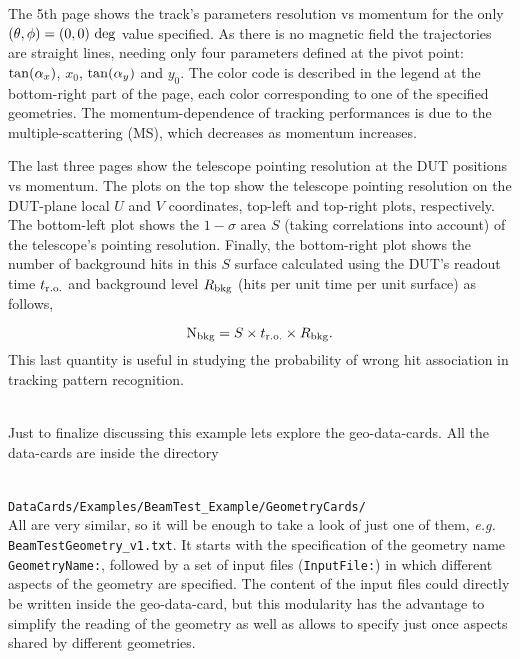 The 5th page shows the track's parameters resolution vs momentum for the only $(\theta,\phi) = (0,0)~{\rm deg}$ value specified. As there is no 
magnetic field the trajectories are straight lines, needing only four parameters defined at the pivot point: ${\rm tan}(\alpha_{x})$, $x_{0}$, 
${\rm tan}(\alpha_{y})$ and $y_{0}$. The color code is described in the legend at the bottom-right part of the page, each color corresponding to 
one of the specified geometries. The momentum-dependence of tracking performances is due to the multiple-scattering (MS), which decreases as 
momentum increases.

The last three pages show the telescope pointing resolution at the DUT positions vs momentum. The plots on the top show the telescope 
pointing resolution on the DUT-plane local $U$ and $V$ coordinates, top-left and top-right plots, respectively. The bottom-left
plot shows the $1-\sigma$ area $S$ (taking correlations into account) of the telescope's pointing resolution. Finally, the bottom-right 
plot shows the number of background hits in this $S$ surface calculated using the DUT's readout time $t_{\rm r.o.}$ and background level 
$R_{\rm bkg}$ (hits per unit time per unit surface) as follows,

\begin{equation}
 {\rm N_{bkg}} = S \times t_{\rm r.o.} \times R_{\rm bkg}.
\end{equation}
\noindent
This last quantity is useful in studying the probability of wrong hit association in tracking pattern recognition.

~\\
\noindent
Just to finalize discussing this example lets explore the geo-data-cards. All the data-cards are inside the directory 

~\\
\noindent
{\tt DataCards/Examples/BeamTest\_Example/GeometryCards/} 
~\\

\noindent
All are very similar, so it will be enough to take a look of just one of them, {\it e.g.} {\tt BeamTestGeometry\_v1.txt}. It 
starts with the specification of the geometry name {\tt GeometryName:}, followed by a set of input files ({\tt InputFile:}) 
in which different aspects of the geometry are specified. The content of the input files could directly be written inside 
the geo-data-card, but this modularity has the advantage to simplify the reading of the geometry as well as allows to specify 
just once aspects shared by different geometries.

